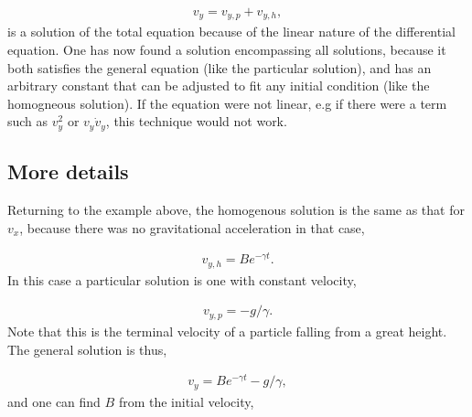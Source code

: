 \documentclass[letterpaper,10pt,english]{sphinxmanual}
\begin{document}
\begin{equation*}
\begin{split}
\begin{equation}
v_y=v_{y,p}+v_{y,h},
\label{_auto9} \tag{9}
\end{equation}
\end{split}
\end{equation*}
is a solution of the total equation because of the linear nature of
the differential equation. One has now found a  solution
encompassing all solutions, because it both satisfies the general
equation (like the particular solution), and has an arbitrary constant
that can be adjusted to fit any initial condition (like the homogneous
solution). If the equation were not linear, e.g if there were a term
such as \(v_y^2\) or \(v_y\dot{v}_y\), this technique would not work.


\subsection{More details}
\label{\detokenize{chapter3:more-details}}
Returning to the example above, the homogenous solution is the same as
that for \(v_x\), because there was no gravitational acceleration in
that case,




\begin{equation*}
\begin{split}
\begin{equation}
v_{y,h}=Be^{-\gamma t}.
\label{_auto10} \tag{10}
\end{equation}
\end{split}
\end{equation*}
In this case a particular solution is one with constant velocity,




\begin{equation*}
\begin{split}
\begin{equation}
v_{y,p}=-g/\gamma.
\label{_auto11} \tag{11}
\end{equation}
\end{split}
\end{equation*}
Note that this is the terminal velocity of a particle falling from a
great height. The general solution is thus,




\begin{equation*}
\begin{split}
\begin{equation}
v_y=Be^{-\gamma t}-g/\gamma,
\label{_auto12} \tag{12}
\end{equation}
\end{split}
\end{equation*}
and one can find \(B\) from the initial velocity,
\end{document}
